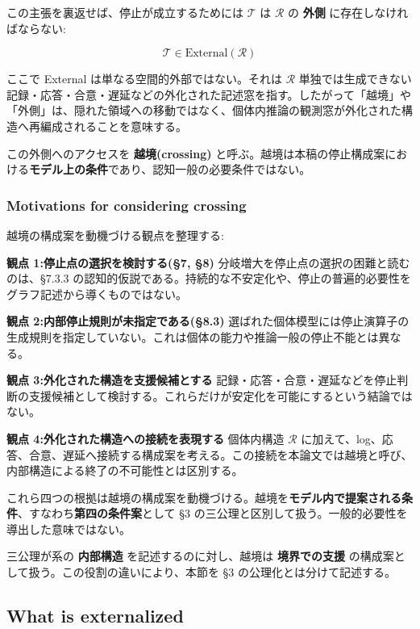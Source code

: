この主張を裏返せば、停止が成立するためには $\mathcal{T}$ は $\mathcal{R}$ の \textbf{外側} に存在しなければならない:

\[
\mathcal{T} \in \text{External}(\mathcal{R})
\]

ここで External は単なる空間的外部ではない。それは $\mathcal{R}$ 単独では生成できない記録・応答・合意・遅延などの外化された記述窓を指す。したがって「越境」や「外側」は、隠れた領域への移動ではなく、個体内推論の観測窓が外化された構造へ再編成されることを意味する。

この外側へのアクセスを \textbf{越境(crossing)} と呼ぶ。越境は本稿の停止構成案における\textbf{モデル上の条件}であり、認知一般の必要条件ではない。

\subsubsection{Motivations for considering crossing}


越境の構成案を動機づける観点を整理する:

\textbf{観点 1:停止点の選択を検討する(\S{}7, \S{}8)}
分岐増大を停止点の選択の困難と読むのは、\S{}7.3.3 の認知的仮説である。持続的な不安定化や、停止の普遍的必要性をグラフ記述から導くものではない。

\textbf{観点 2:内部停止規則が未指定である(\S{}8.3)}
選ばれた個体模型には停止演算子の生成規則を指定していない。これは個体の能力や推論一般の停止不能とは異なる。

\textbf{観点 3:外化された構造を支援候補とする}
記録・応答・合意・遅延などを停止判断の支援候補として検討する。これらだけが安定化を可能にするという結論ではない。

\textbf{観点 4:外化された構造への接続を表現する}
個体内構造 $\mathcal{R}$ に加えて、log、応答、合意、遅延へ接続する構成案を考える。この接続を本論文では越境と呼び、内部構造による終了の不可能性とは区別する。

これら四つの根拠は越境の構成案を動機づける。越境を\textbf{モデル内で提案される条件}、すなわち\textbf{第四の条件案}として \S{}3 の三公理と区別して扱う。一般的必要性を導出した意味ではない。

三公理が系の \textbf{内部構造} を記述するのに対し、越境は \textbf{境界での支援} の構成案として扱う。この役割の違いにより、本節を \S{}3 の公理化とは分けて記述する。

\subsection{What is externalized}


